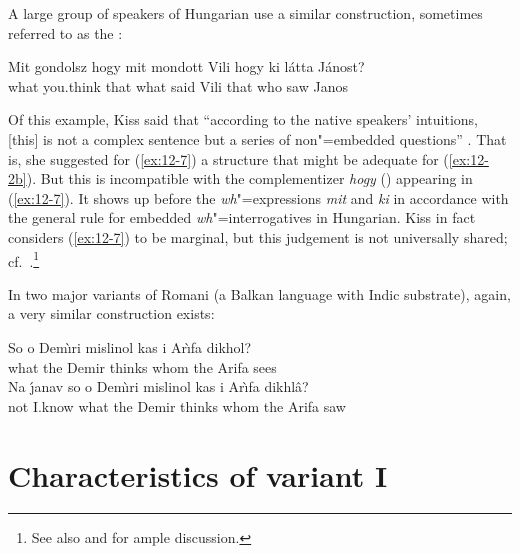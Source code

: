 \documentclass[output=paper]{langsci/langscibook}
\begin{document}
A large group of speakers of Hungarian use a similar construction, sometimes
referred to as the :
\begin{exe}
\ex
\label{ex:12-7}
\gll
Mit gondolsz hogy mit mondott Vili hogy ki l\'atta J\'anost? \\
what you.think that what said Vili that who saw Janos \\
\end{exe}
Of this example, Kiss said that ``according to the native speakers'
intuitions, [this] is not a complex sentence but a series of
non"=embedded questions'' \citep[212]{Kiss1988}.  That is, she
suggested for (\ref{ex:12-7}) a structure that might be adequate for (\ref{ex:12-2b}). But
this is incompatible with the complementizer \textit{hogy} ()
appearing in (\ref{ex:12-7}). It shows up before the \emph{wh}"=expressions
\textit{mit} and \textit{ki} in accordance with the general rule for
embedded \emph{wh}"=interrogatives in Hungarian. Kiss in fact
considers (\ref{ex:12-7}) to be marginal, but this judgement is not universally
shared; cf.\ \citet{Maracz1987}.\footnote{%
	See also \citet[Ch.\,7]{Maracz1989}
  and \citet{Horvath1995} for ample discussion.%
}

In two major variants of Romani (a Balkan language with Indic
substrate), again, a very similar construction exists:
\begin{exe}
\ex
\label{ex:12-8}
\begin{xlist}
\ex
\label{ex:12-8a}
\gll
So o Dem\`{\i}ri mislinol kas i Ar\`{\i}fa dikhol? \\
what the Demir thinks whom the Arifa sees \\
\ex
\label{ex:12-8b}
\gll
Na \'{\j}anav so o Dem\`{\i}ri mislinol kas i Ar\`{\i}fa dikhl\^a? \\
not I.know what the Demir thinks whom the Arifa saw \\
\end{xlist}
\end{exe}

\section{Characteristics of variant I}
\label{sec:12-3}
\end{document}
